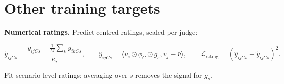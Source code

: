\documentclass[10pt]{article}
\begin{document}
\section*{Other training targets}

\textbf{Numerical ratings.} Predict centred ratings, scaled per judge:

\[
\widetilde y_{ijCs}
=\frac{y_{ijCs}-\frac{1}{M}\sum_k y_{ikCs}}{\kappa_i},
\qquad
\widehat y_{ijCs}=\langle u_i\odot\phi_C\odot g_s,v_j-\bar v\rangle,
\qquad
\mathcal L_{\mathrm{rating}}=(\widehat y_{ijCs}-\widetilde y_{ijCs})^2.
\]

Fit scenario-level ratings; averaging over $s$ removes the signal for $g_s$.
\end{document}
